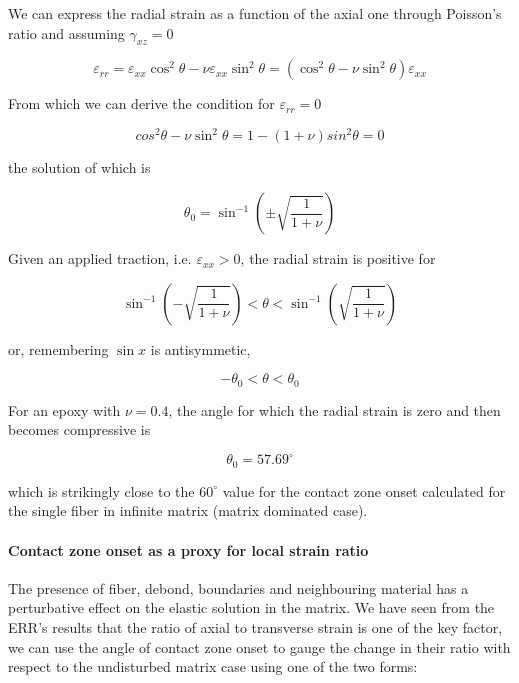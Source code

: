 \documentclass[review]{elsarticle}
\begin{document}
We can express the radial strain as a function of the axial one through Poisson's ratio and assuming $\gamma_{xz}=0$

\begin{equation}
\varepsilon_{rr}=\varepsilon_{xx}\cos^{2}{\theta}-\nu\varepsilon_{xx}\sin^{2}{\theta}=\left(\cos^{2}{\theta}-\nu\sin^{2}{\theta}\right)\varepsilon_{xx}
\end{equation}

From which we can derive the condition for $\varepsilon_{rr}=0$

\begin{equation}
cos^{2}{\theta}-\nu\sin^{2}{\theta}=1-(1+\nu)sin^{2}{\theta}=0
\end{equation}

the solution of which is

\begin{equation}
\theta_{0}=\sin^{-1}{\left(\pm\sqrt{\frac{1}{1+\nu}}\right)}
\end{equation}

Given an applied traction, i.e. $\varepsilon_{xx}>0$, the radial strain is positive for

\begin{equation}
\sin^{-1}{\left(-\sqrt{\frac{1}{1+\nu}}\right)}<\theta<\sin^{-1}{\left(\sqrt{\frac{1}{1+\nu}}\right)}
\end{equation}

or, remembering $\sin{x}$ is antisymmetic,

\begin{equation}
-\theta_{0}<\theta<\theta_{0}
\end{equation}

For an epoxy with $\nu=0.4$, the angle for which the radial strain is zero and then becomes compressive is 

\begin{equation}
\theta_{0}=57.69^{\circ}
\end{equation}

which is strikingly close to the $60^{\circ}$ value for the contact zone onset calculated for the single fiber in infinite matrix (matrix dominated case).

\paragraph{Contact zone onset as a proxy for local strain ratio}

The presence of fiber, debond, boundaries and neighbouring material has a perturbative effect on the elastic solution in the matrix. We have seen from the ERR's results that the ratio of axial to transverse strain is one of the key factor, we can use the angle of contact zone onset to gauge the change in their ratio with respect to the undisturbed matrix case using one of the two forms:
\end{document}
